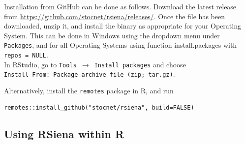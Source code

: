 \documentclass[a4paper,fleqn,11pt]{article}
\newcommand{\+}{\, + \,}
\newcommand{\sfn}[1]{\textsf{#1}}
\newcommand{\Rn}{{\sf R}}
\newcommand{\RS}{{\sf \textsf{RSiena} }}
\begin{document}
\begin{enumerate}
            Installation from GitHub can be done as follows.
        Download  the latest release from
        \url{https://github.com/stocnet/rsiena/releases/}.
Once the file has been downloaded, unzip it, and install the binary
as appropriate for your Operating System.
This can be done in Windows using the dropdown menu under \texttt{Packages},
and for all Operating Systems using function \sfn{install.packages}
with \texttt{repos = NULL}.\\
In \sfn{RStudio}, go to \texttt{Tools  $\rightarrow$ Install packages}
and choose\\ \texttt{Install From: Package archive file (zip; tar.gz)}.

Alternatively, install the \texttt{remotes} package in R,
and run
\begin{verbatim}
remotes::install_github("stocnet/rsiena", build=FALSE)
\end{verbatim}
\end{enumerate}


\subsection{Using \RS within \Rn}
\end{document}
